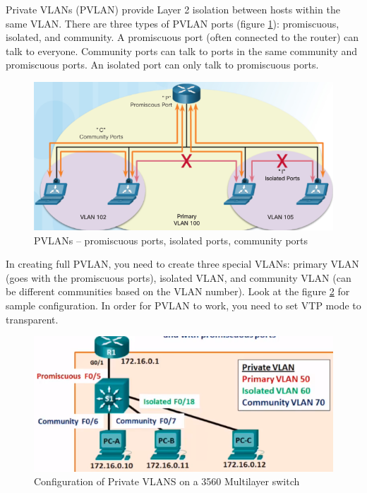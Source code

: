 Private VLANs (PVLAN) provide Layer 2 isolation between hosts within the same VLAN. There are three types of PVLAN ports (figure \ref{PVLAN}): promiscuous, isolated, and community. A promiscuous port (often connected to the router) can talk to everyone. Community ports can talk to ports in the same community and promiscuous ports. An isolated port can only talk to promiscuous ports.


\begin{figure}[hbtp]
\caption{PVLANs -- promiscuous ports, isolated ports, community ports}\label{PVLAN}
\centering
\includegraphics[scale=0.5]{pictures/PVLAN.PNG}
\end{figure}


In creating full PVLAN, you need to create three special VLANs: primary VLAN (goes with the promiscuous ports), isolated VLAN, and community VLAN (can be different communities based on the VLAN number). Look at the figure \ref{PVLANconfig} for sample configuration. In order for PVLAN to work, you need to set VTP mode to transparent. 

\begin{figure}[hbtp]
\caption{Configuration of Private VLANS on a 3560 Multilayer switch}\label{PVLANconfig}
\centering
\includegraphics[scale=0.5]{pictures/PVLANconfig.PNG}
\end{figure}

